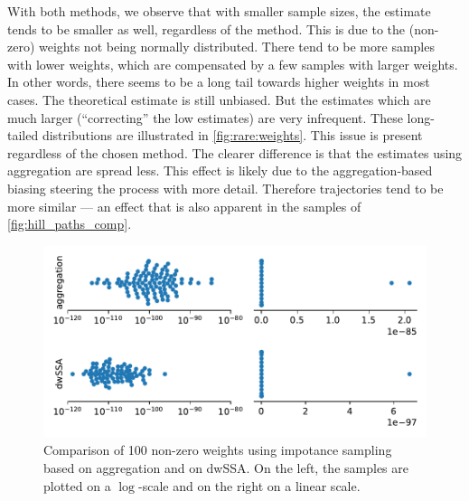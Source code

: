 With both methods, we observe that with smaller sample sizes, the estimate tends to be smaller as well, regardless of the method.
This is due to the (non-zero) weights not being normally distributed.
There tend to be more samples with lower weights, which are compensated by a few samples with larger weights.
In other words, there seems to be a long tail towards higher weights in most cases.
The theoretical estimate is still unbiased.
But the estimates which are much larger (``correcting'' the low estimates) are very infrequent.
These long-tailed distributions are illustrated in \autoref{fig:rare:weights}.
This issue is present regardless of the chosen method.
The clearer difference is that the estimates using aggregation are spread less.
This effect is likely due to the aggregation-based biasing steering the process with more detail.
Therefore trajectories tend to be more similar --- an effect that is also apparent in the samples of \autoref{fig:hill_paths_comp}.
\begin{figure}[htb]
    \centering
    \includegraphics[scale=.55]{gfx/weights.pdf}
    \caption[Weight distribution of different \ac{IS} methods]{\label{fig:rare:weights}Comparison of \num{100} non-zero weights using impotance sampling based on aggregation and on dwSSA. On the left, the samples are plotted on a $\log$-scale and on the right on a linear scale.}
\end{figure}

